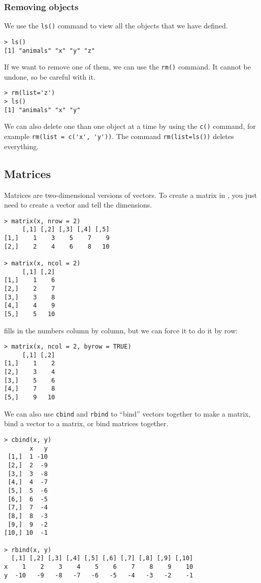 \subsubsection*{Removing objects}

We use the \verb|ls()| command to view all the objects that we have defined. 

\begin{lstlisting}
> ls()
[1] "animals" "x" "y" "z"
\end{lstlisting}

If we want to remove one of them, we can use the \verb|rm()| command. It cannot be undone, so be careful with it.

\begin{lstlisting}
> rm(list='z')
> ls()
[1] "animals" "x" "y"
\end{lstlisting}

We can also delete one than one object at a time by using the \verb|c()| command, for example \verb|rm(list = c('x', 'y'))|. The command \verb|rm(list=ls())| deletes everything.

\subsection{Matrices}

Matrices are two-dimensional versions of vectors. To create a matrix in \R, you just need to create a vector and tell \R the dimensions.

\begin{lstlisting}
> matrix(x, nrow = 2)
     [,1] [,2] [,3] [,4] [,5]
[1,]    1    3    5    7    9
[2,]    2    4    6    8   10

> matrix(x, ncol = 2)
     [,1] [,2]
[1,]    1    6
[2,]    2    7
[3,]    3    8
[4,]    4    9
[5,]    5   10
\end{lstlisting}

\R fills in the numbers column by column, but we can force it to do it by row:

\begin{lstlisting}
> matrix(x, ncol = 2, byrow = TRUE)
     [,1] [,2]
[1,]    1    2
[2,]    3    4
[3,]    5    6
[4,]    7    8
[5,]    9   10
\end{lstlisting}

We can also use \verb|cbind| and \verb|rbind| to ``bind'' vectors together to make a matrix, bind a vector to a matrix, or bind matrices together.

\begin{lstlisting}
> cbind(x, y)
       x   y
 [1,]  1 -10
 [2,]  2  -9
 [3,]  3  -8
 [4,]  4  -7
 [5,]  5  -6
 [6,]  6  -5
 [7,]  7  -4
 [8,]  8  -3
 [9,]  9  -2
[10,] 10  -1

> rbind(x, y)
  [,1] [,2] [,3] [,4] [,5] [,6] [,7] [,8] [,9] [,10]
x    1    2    3    4    5    6    7    8    9    10
y  -10   -9   -8   -7   -6   -5   -4   -3   -2    -1
\end{lstlisting}

